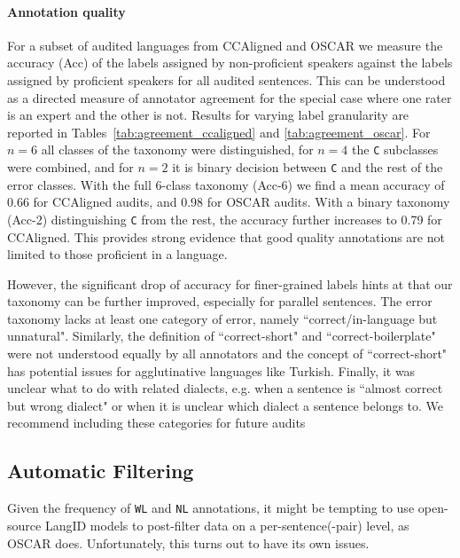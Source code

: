 \paragraph{Annotation quality}
For a subset of audited languages from CCAligned and OSCAR we measure the accuracy (Acc) of the labels assigned by non-proficient speakers against the labels assigned by proficient speakers for all audited sentences. This can be understood as a directed measure of annotator agreement for the special case where one rater is an expert and the other is not. Results for varying label granularity are reported in Tables~\ref{tab:agreement_ccaligned} and \ref{tab:agreement_oscar}. For $n=6$ all classes of the taxonomy were distinguished, for $n=4$ the \texttt{C} subclasses were combined, and for $n=2$ it is binary decision between \texttt{C} and the rest of the error classes. With the full 6-class taxonomy (Acc-6) we find a mean accuracy of 0.66
for CCAligned audits, and 0.98
for OSCAR audits. %
With a binary taxonomy (Acc-2) distinguishing \texttt{C} from the rest, the accuracy further increases to 0.79
for CCAligned. This provides strong evidence that good quality annotations are not limited to those proficient in a language.

However, the significant drop of accuracy for finer-grained labels hints at that our taxonomy can be further improved, especially for parallel sentences.
The error taxonomy lacks at least one category of error, namely ``correct/in-language but unnatural".  Similarly, the definition of ``correct-short" and ``correct-boilerplate" were not understood equally by all annotators and the concept of ``correct-short" has potential issues for agglutinative languages like Turkish. Finally, it was unclear what to do with related dialects, e.g. when a sentence is ``almost correct but wrong dialect" or when it is unclear which dialect a sentence belongs to. We recommend including these categories for future audits

\subsection{Automatic Filtering}
Given the frequency of \texttt{WL} and \texttt{NL} annotations, it might be tempting to use open-source LangID models to post-filter data on a per-sentence(-pair) level, as OSCAR does. Unfortunately, this turns out to have its own issues.

